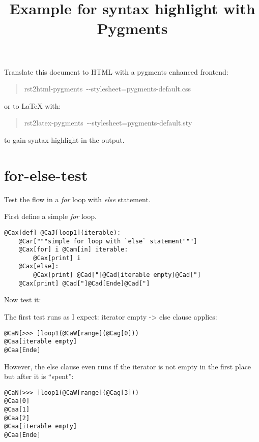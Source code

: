 \documentclass[10pt,a4paper,english]{article}
\title{Example for syntax highlight with Pygments}
\author{}
\date{}
\newlength{\locallinewidth}
\newcommand{\titlereference}[1]{\textsl{#1}}
\begin{document}
\maketitle


\setlength{\locallinewidth}{\linewidth}

Translate this document to HTML with a pygments enhanced frontend:
\begin{quote}{\ttfamily \raggedright \noindent
rst2html-pygments~-{}-stylesheet=pygments-default.css
}\end{quote}

or to LaTeX with:
\begin{quote}{\ttfamily \raggedright \noindent
rst2latex-pygments~-{}-stylesheet=pygments-default.sty
}\end{quote}

to gain syntax highlight in the output.



\hypertarget{for-else-test}{}
\section*{for-else-test}

Test the flow in a \titlereference{for} loop with \titlereference{else} statement.

First define a simple \titlereference{for} loop.
\begin{Verbatim}[commandchars=@\[\]]
@Cax[def] @CaJ[loop1](iterable):
    @Car["""simple for loop with `else` statement"""]
    @Cax[for] i @Cam[in] iterable:
        @Cax[print] i
    @Cax[else]:
        @Cax[print] @Cad["]@Cad[iterable empty]@Cad["]
    @Cax[print] @Cad["]@Cad[Ende]@Cad["]

\end{Verbatim}

Now test it:

The first test runs as I expect: iterator empty -{\textgreater} else clause applies:
\begin{Verbatim}[commandchars=@\[\]]
@CaN[>>> ]loop1(@CaW[range](@Cag[0]))
@Caa[iterable empty]
@Caa[Ende]

\end{Verbatim}

However, the else clause even runs if the iterator is not empty in the first
place but after it is ``spent'':
\begin{Verbatim}[commandchars=@\[\]]
@CaN[>>> ]loop1(@CaW[range](@Cag[3]))
@Caa[0]
@Caa[1]
@Caa[2]
@Caa[iterable empty]
@Caa[Ende]

\end{Verbatim}
\end{document}
